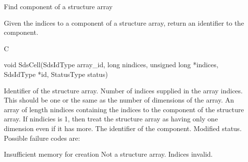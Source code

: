 \begin{manroutinedescription}
      Find component of a structure array

      Given the indices to a component of a structure array, return an
      identifier to the component.
 
      C

      void SdsCell(SdsIdType array\_{}id, long nindices, unsigned long *indices,
               SdsIdType *id, StatusType {\mantt{*}} {} status)
 
\begin{manparametertable}
 Identifier of the %
structure array.
  Number of indices supplied in %
the
                            array indices. This should be one or the same as
                            the number of dimensions of the array.
  An array of length %
nindices containing
                            the indices to the component of the structure
                            array. If nindicies is 1, then treat the
                            structure array as having only one dimension even
                            if it has more.
 The identifier of the component.
 Modified status. Possible %
failure codes are:
\end{manparametertable}
\begin{mantwocolumntable}
Insufficient memory for creation
Not a structure array.
Indices invalid.
\end{mantwocolumntable}
\end{manroutinedescription}
